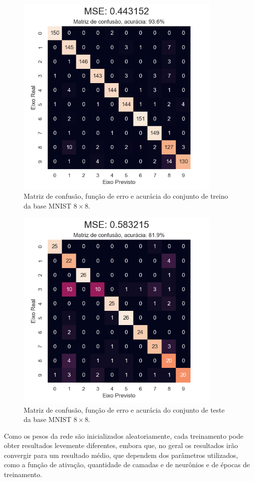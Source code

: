 \begin{figure}[htb]
\centering
\includegraphics[width=10cm]{figuras/mnist_treino}
\caption{Matriz de confusão, função de erro e acurácia do conjunto de treino da base MNIST $8\times8$.}
\label{fig:mnist_treino}
\end{figure}

\begin{figure}[htb]
\centering
\includegraphics[width=10cm]{figuras/mnist_test}
\caption{Matriz de confusão, função de erro e acurácia do conjunto de teste da base MNIST $8\times8$.}
\label{fig:mnist_test}
\end{figure}

Como os pesos da rede são inicializados aleatoriamente, cada treinamento pode obter resultados levemente diferentes, embora que, no geral os resultados irão convergir para um resultado médio, que dependem dos parâmetros utilizados, como a função de ativação, quantidade de camadas e de neurônios e de épocas de treinamento.

